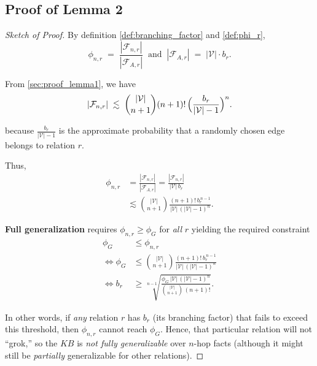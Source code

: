     \subsection{Proof of Lemma 2} \label{sec:proof_lemma2}
        \begin{proof}[Sketch of Proof]
            By definition \ref{def:branching_factor} and \ref{def:phi_r},
                    \[
                    \phi_{n,r}\;=\;\frac{|\mathcal{F}_{n,r}|}{|\mathcal{F}_{A,r}|}
                    \;\;\text{and}\;\;
                    |\mathcal{F}_{A,r}| 
                    \;=\; |\mathcal{V}|\cdot b_r.
                    \]
                    
            From \ref{sec:proof_lemma1}, we have
            \[
            |\mathcal{F}_{n,r}| 
            \;\lesssim\;
            \binom{|\mathcal{V}|}{n+1}(n+1)!\,\Bigl(\frac{b_r}{|\mathcal{V}|-1}\Bigr)^n.
            \]
            
            because $\frac{b_r}{|\mathcal{V}|-1}$ is the approximate probability that a randomly chosen edge belongs to relation $r$.

            Thus,
            \begin{align*}
                \phi_{n,r} &= \frac{|\mathcal{F}_{n,r}|}{|\mathcal{F}_{A,r}|} =\frac{|\mathcal{F}_{n,r}|}{|\mathcal{V}|\,b_r} \\
                & \lesssim \binom{|\mathcal{V}|}{n+1}\frac{(n+1)!\,b_r^{\,n-1}}{|\mathcal{V}|\,(|\mathcal{V}|-1)^n}.
            \end{align*}
            
            \textbf{Full generalization} requires $\phi_{n,r}\ge\phi_G$ for \emph{all} $r$ yielding the required constraint
            \begin{align*}
            \phi_G &\leq\phi_{n,r} \\
            \Leftrightarrow \phi_G&\leq \binom{|\mathcal{V}|}{n+1}\frac{(n+1)!\,b_r^{\,n-1}}{|\mathcal{V}|\,(|\mathcal{V}|-1)^n} \\
            \Leftrightarrow b_r &\geq \sqrt[n-1]{
            \frac{\phi_G\,|\mathcal{V}|\,(|\mathcal{V}|-1)^n}{\binom{|\mathcal{V}|}{n+1}\,(n+1)!}
            }.
            \end{align*}
            
            In other words, if \emph{any} relation $r$ has $b_r$ (its branching factor) that fails to exceed this threshold, then $\phi_{n,r}$ cannot reach $\phi_G$. Hence, that particular relation will not “grok,” so the $KB$ is \emph{not fully generalizable} over $n$-hop facts (although it might still be \emph{partially} generalizable for other relations).
        \end{proof}


